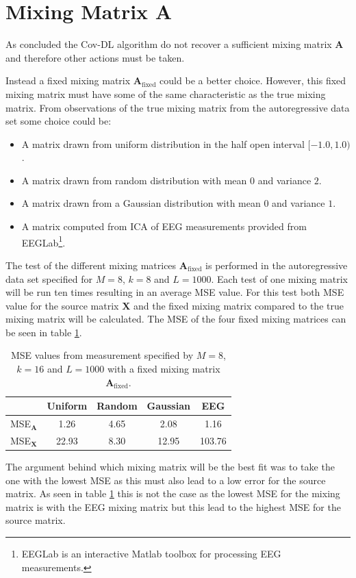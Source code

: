\section{Mixing Matrix A}
As concluded the Cov-DL algorithm do not recover a sufficient mixing matrix $\mathbf{A}$ and therefore other actions must be taken. 

Instead a fixed mixing matrix $\mathbf{A}_{\text{fixed}}$ could be a better choice. However, this fixed mixing matrix must have some of the same characteristic as the true mixing matrix. 
From observations of the true mixing matrix from the autoregressive data set some choice could be:
\begin{itemize}
\item A matrix drawn from uniform distribution in the half open interval $[-1.0, 1.0)$.
\item A matrix drawn from random distribution with mean $0$ and variance $2$.
\item A matrix drawn from a Gaussian distribution with mean $0$ and variance $1$.
\item A matrix computed from ICA of EEG measurements provided from EEGLab\footnote{EEGLab is an interactive Matlab toolbox for processing EEG measurements.}.
\end{itemize}
The test of the different mixing matrices $\mathbf{A}_{\text{fixed}}$ is performed in the autoregressive data set specified for $M = 8$, $k = 8$ and $L = 1000$. Each test of one mixing matrix will be run ten times resulting in an average MSE value. For this test both MSE value for the source matrix $\mathbf{X}$ and the fixed mixing matrix compared to the true mixing matrix will be calculated. 
The MSE of the four fixed mixing matrices can be seen in table \ref{tab:fixed}.
\begin{table}[H]
\centering
\begin{tabular}{|c|c|c|c|c|}
\hline
 & Uniform & Random & Gaussian & EEG \\
\hline
MSE$_\mathbf{A}$ & 1.26 & 4.65 & 2.08 & 1.16 \\
\hline
MSE$_\mathbf{X}$ & 22.93 & 8.30 & 12.95 & 103.76 \\
\hline
\end{tabular}
\caption{MSE values from measurement specified by $M=8$, $k=16$ and $L=1000$ with a fixed mixing matrix $\mathbf{A}_{\text{fixed}}$.}
\label{tab:fixed}
\end{table}
\noindent
The argument behind which mixing matrix will be the best fit was to take the one with the lowest MSE as this must also lead to a low error for the source matrix. As seen in table \ref{tab:fixed} this is not the case as the lowest MSE for the mixing matrix is with the EEG mixing matrix but this lead to the highest MSE for the source matrix. 
